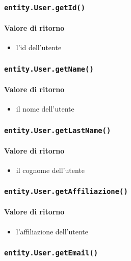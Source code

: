 \subsubsection{\texttt{entity.User.getId()}}
\paragraph{Valore di ritorno}
\begin{itemize}
\item l'id dell'utente
\end{itemize}

\subsubsection{\texttt{entity.User.getName()}}
\paragraph{Valore di ritorno}
\begin{itemize}
\item il nome dell'utente
\end{itemize}

\subsubsection{\texttt{entity.User.getLastName()}}
\paragraph{Valore di ritorno}
\begin{itemize}
\item il cognome dell'utente
\end{itemize}

\subsubsection{\texttt{entity.User.getAffiliazione()}}
\paragraph{Valore di ritorno}
\begin{itemize}
\item l'affiliazione dell'utente
\end{itemize}

\subsubsection{\texttt{entity.User.getEmail()}}
